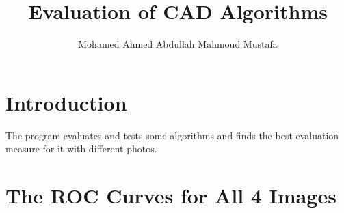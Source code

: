 \documentclass[a4paper, 11pt]{article}
\title{\textbf{Evaluation of CAD Algorithms}}
\author{Mohamed Ahmed Abdullah Mahmoud Mustafa}
\begin{document}
\maketitle


\section*{Introduction}

The program evaluates and tests some algorithms and finds the best evaluation measure for it with different photos.

\section*{The ROC Curves for All 4 Images}

\begin{figure}[hbt!]


\end{figure}
\end{document}
